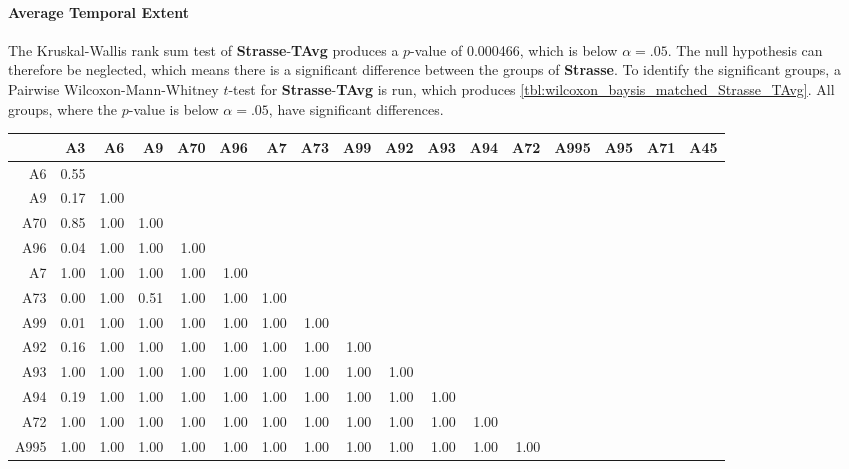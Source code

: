\paragraph{Average Temporal Extent}
The Kruskal-Wallis rank sum test of \textbf{Strasse}-\textbf{TAvg} produces a $p$-value of 0.000466, which is below $\alpha=.05$. The null hypothesis can therefore be neglected, which means there is a significant difference between the groups of \textbf{Strasse}. To identify the significant groups, a Pairwise Wilcoxon-Mann-Whitney $t$-test for \textbf{Strasse}-\textbf{TAvg} is run, which produces \autoref{tbl:wilcoxon_baysis_matched_Strasse_TAvg}. All groups, where the $p$-value is below $\alpha=.05$, have significant differences. 
\begin{table}[ht]
	\tiny
	\setlength{\tabcolsep}{4pt}
	\centering
	\begin{tabular}{rrrrrrrrrrrrrrrrr}
		\toprule
				& A3 & A6 & A9 & A70 & A96 & A7 & A73 & A99 & A92 & A93 & A94 & A72 & A995 & A95 & A71 & A45 \\ 
		\midrule
		A6 		& 0.55 &  &  &  &  &  &  &  &  &  &  &  &  &  &  &  \\ 
		A9 		& 0.17 & 1.00 &  &  &  &  &  &  &  &  &  &  &  &  &  &  \\ 
		A70		& 0.85 & 1.00 & 1.00 &  &  &  &  &  &  &  &  &  &  &  &  &  \\ 
		A96 	& 0.04 & 1.00 & 1.00 & 1.00 &  &  &  &  &  &  &  &  &  &  &  &  \\ 
		A7 		& 1.00 & 1.00 & 1.00 & 1.00 & 1.00 &  &  &  &  &  &  &  &  &  &  &  \\ 
		A73 	& 0.00 & 1.00 & 0.51 & 1.00 & 1.00 & 1.00 &  &  &  &  &  &  &  &  &  &  \\ 
		A99 	& 0.01 & 1.00 & 1.00 & 1.00 & 1.00 & 1.00 & 1.00 &  &  &  &  &  &  &  &  &  \\ 
		A92 	& 0.16 & 1.00 & 1.00 & 1.00 & 1.00 & 1.00 & 1.00 & 1.00 &  &  &  &  &  &  &  &  \\ 
		A93 	& 1.00 & 1.00 & 1.00 & 1.00 & 1.00 & 1.00 & 1.00 & 1.00 & 1.00 &  &  &  &  &  &  &  \\ 
		A94 	& 0.19 & 1.00 & 1.00 & 1.00 & 1.00 & 1.00 & 1.00 & 1.00 & 1.00 & 1.00 &  &  &  &  &  &  \\ 
		A72 	& 1.00 & 1.00 & 1.00 & 1.00 & 1.00 & 1.00 & 1.00 & 1.00 & 1.00 & 1.00 & 1.00 &  &  &  &  &  \\ 
		A995 	& 1.00 & 1.00 & 1.00 & 1.00 & 1.00 & 1.00 & 1.00 & 1.00 & 1.00 & 1.00 & 1.00 & 1.00 &  &  &  &  \\ 

\end{tabular}
\end{table}
